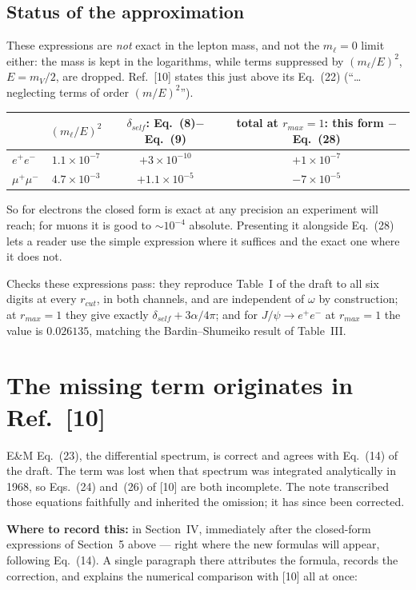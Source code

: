 \documentclass[11pt]{article}
\begin{document}
\subsection*{Status of the approximation}

These expressions are \emph{not} exact in the lepton mass, and not the
$m_\ell=0$ limit either: the mass is kept in the logarithms, while terms
suppressed by $(m_\ell/E)^{2}$, $E=m_V/2$, are dropped. Ref.~[10] states this
just above its Eq.~(22) (``\ldots neglecting terms of order $(m/E)^{2}$'').
\begin{center}
\begin{tabular}{lccc}
\toprule
 & $(m_\ell/E)^{2}$ & $\delta_{self}$: Eq.~(8)$-$Eq.~(9) & total at $r_{max}=1$: this form $-$ Eq.~(28)\\
\midrule
$e^+e^-$     & $1.1\times10^{-7}$ & $+3\times10^{-10}$  & $+1\times10^{-7}$\\
$\mu^+\mu^-$ & $4.7\times10^{-3}$ & $+1.1\times10^{-5}$ & $-7\times10^{-5}$\\
\bottomrule
\end{tabular}
\end{center}
So for electrons the closed form is exact at any precision an experiment will
reach; for muons it is good to $\sim10^{-4}$ absolute. Presenting it alongside
Eq.~(28) lets a reader use the simple expression where it suffices and the exact
one where it does not.

Checks these expressions pass: they reproduce Table~I of the draft to all six
digits at every $r_{cut}$, in both channels, and are independent of $\omega$ by
construction; at $r_{max}=1$ they give exactly $\delta_{self}+3\alpha/4\pi$; and
for $J/\psi\to e^+e^-$ at $r_{max}=1$ the value is $0.026135$, matching the
Bardin--Shumeiko result of Table~III.

\section{The missing term originates in Ref.~[10]}

E\&M Eq.~(23), the differential spectrum, is correct and agrees with Eq.~(14) of
the draft. The term was lost when that spectrum was integrated analytically in
1968, so Eqs.~(24) and~(26) of [10] are both incomplete. The note transcribed
those equations faithfully and inherited the omission; it has since been
corrected.

\textbf{Where to record this:} in Section~IV, immediately after the closed-form
expressions of Section~5 above --- right where the new formulas will appear,
following Eq.~(14). A single paragraph there attributes the formula, records the
correction, and explains the numerical comparison with [10] all at once:
\end{document}

